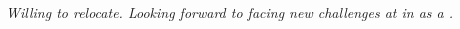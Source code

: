 


\newcommand\hSpaceLen{4pt}
\newcommand\vSpaceLen{6pt}

\begin{paracol}{2}[]
    \textbf{\huge{\bioName}}
    \switchcolumn
    \bioHeader
\end{paracol}

\vspace{\vSpaceLen}

\begin{center}
     \bioEmailUrl{} \hspace{\hSpaceLen}  \bioPhoneUrl{} \hspace{\hSpaceLen}  \bioHomepageUrl{}
    \\  \bioOrcidUrl{} \hspace{\hSpaceLen}  \bioResearchGateUrl{} \hspace{\hSpaceLen}  \bioLinkedInUrl{} \hspace{\hSpaceLen}  \bioGitHubUrl{} \\

    \vspace{\vSpaceLen}

    \begin{justify}
    \textit{\bioSummary{} Willing to relocate. Looking forward to facing new challenges at \positionCompany{} in \positionLocation{} as a \positionName{}.}
    \end{justify}
\end{center}



    